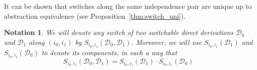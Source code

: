 \documentclass[a4paper,UKenglish,cleveref,pdftex,thm-restate,numberwithinsect,anonymous]{lipics}
\def\G{\textbf {\textup{G}}}
\newcommand{\dder}[1]{\mathscr{#1}}
\newcommand{\der}[1]{\underline{\dder{#1}}}
\newtheorem*{notation}{Notation}
\begin{document}
\begin{definition}[Switch]

\end{definition}

It can be shown that switches along the same independence pair are unique up to abstraction
equivalence (see Proposition~\ref{thm:switch_uni}).

\begin{notation} We will denote any switch of two switchable direct derivations $\dder{D}_0$ and $\dder{D}_1$ along $(i_0, i_1)$ by $S_{i_0, i_1}(\dder{D}_0, \dder{D}_1)$. Moreover, we will use $S_{i_0,i_1}(\dder{D}_1)$ and  $S_{i_0,i_1}(\dder{D}_0)$ to denote its components, in such a way that \[S_{i_0, i_1}(\dder{D}_0, \dder{D}_1)=S_{i_0,i_1}(\dder{D}_1)\cdot S_{i_0,i_1}(\dder{D}_0)\]
\end{notation}
\end{document}
